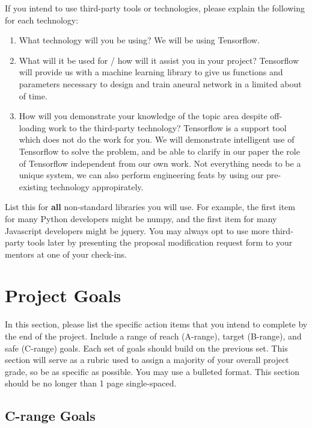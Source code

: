 \documentclass[]{article}
\begin{document}
If you intend to use third-party tools or technologies, please explain the following for each technology:

\begin{enumerate}
	\item What technology will you be using?
        We will be using Tensorflow.
        \item What will it be used for / how will it assist you in your project?
        Tensorflow will provide us with a machine learning library to give us functions and parameters necessary to design and train aneural network in a limited about of time.
        \item How will you demonstrate your knowledge of the topic area despite off-loading work to the third-party technology?
        Tensorflow is a support tool which does not do the work for you.  We will demonstrate intelligent use of Tensorflow to solve the problem, and be able to clarify in our paper the role of Tensorflow independent from our own work.  Not everything needs to be a unique system, we can also perform engineering feats by using our pre-existing technology appropirately.
\end{enumerate}

List this for \textbf{all} non-standard libraries you will use. For example, the first item for many Python developers might be numpy, and the first item for many Javascript developers might be jquery. You may always opt to use more third-party tools later by presenting the proposal modification request form to your mentors at one of your check-ins.

\section{Project Goals}

In this section, please list the specific action items that you intend to complete by the end of the project. Include a range of reach (A-range), target (B-range), and safe (C-range) goals. Each set of goals should build on the previous set. This section will serve as a rubric used to assign a majority of your overall project grade, so be as specific as possible. You may use a bulleted format. This section should be no longer than 1 page single-spaced.

\subsection{C-range Goals}
\end{document}
